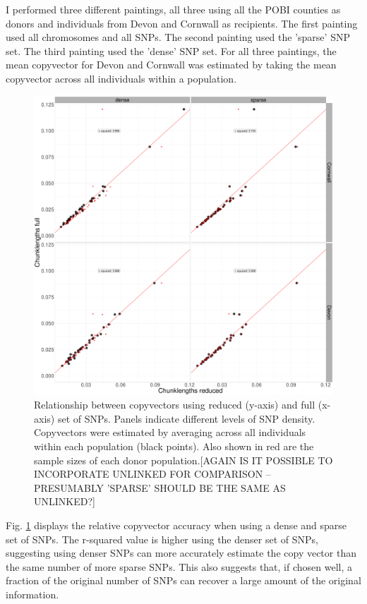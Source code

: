I performed three different paintings, all three using all the POBI counties as donors and individuals from Devon and Cornwall as recipients. The first painting used all chromosomes and all SNPs. The second painting used the 'sparse' SNP set. The third painting used the 'dense' SNP set. For all three paintings, the mean copyvector for Devon and Cornwall was estimated by taking the mean copyvector across all individuals within a population. 

\begin{figure}[htp]
    \centering
    \includegraphics[width=1.0\textwidth]{../images/chapter1/dense_sparse_devon_cornwall_collapsed.pdf}
    \caption{Relationship between copyvectors using reduced (y-axis) and full (x-axis) set of SNPs. Panels indicate different levels of SNP density. Copyvectors were estimated by averaging across all individuals within each population (black points). Also shown in red are the sample sizes of each donor population.{\color{red}[AGAIN IS IT POSSIBLE TO INCORPORATE UNLINKED FOR COMPARISON -- PRESUMABLY 'SPARSE' SHOULD BE THE SAME AS UNLINKED?]}}
    \label{fig:dense_sparse_devon_cornwall_collapsed}
\end{figure}

Fig. \ref{fig:dense_sparse_devon_cornwall_collapsed} displays the relative copyvector accuracy when using a dense and sparse set of SNPs. The r-squared value is higher using the denser set of SNPs, suggesting using denser SNPs can more accurately estimate the copy vector than the same number of more sparse SNPs. This also suggests that, if chosen well, a fraction of the original number of SNPs can recover a large amount of the original information. 

